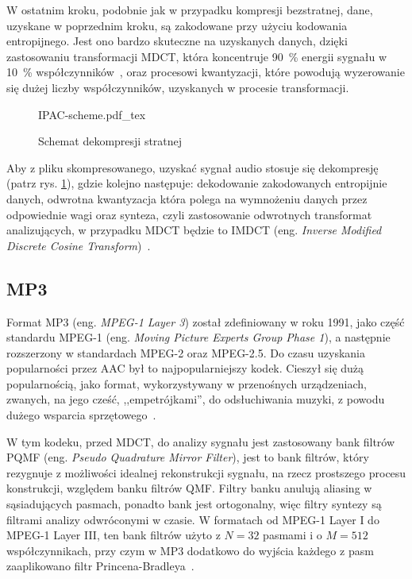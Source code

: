 \documentclass[pl,12pt]{aghdpl}
\let\Oldsubsection\subsection%
\renewcommand{\subsection}{\FloatBarrier\Oldsubsection}
\begin{document}
W ostatnim kroku, podobnie jak w przypadku kompresji bezstratnej, dane,
uzyskane w poprzednim kroku, są zakodowane przy użyciu kodowania entropijnego.
Jest ono bardzo skuteczne na uzyskanych danych, dzięki zastosowaniu
transformacji MDCT, która koncentruje \SI{90}{\percent} energii sygnału w
\SI{10}{\percent} współczynników~\cite{WangYaroslavskyVilermoVaananen2000}, oraz
procesowi kwantyzacji, które powodują wyzerowanie się dużej liczby
współczynników, uzyskanych w procesie transformacji.

\begin{figure}[!tbh]
  \centering
  {IPAC-scheme.pdf_tex}
  \caption{Schemat dekompresji stratnej}
  \label{fig:IPAC_scheme}
\end{figure}

Aby z pliku skompresowanego, uzyskać sygnał audio stosuje się dekompresję
(patrz rys. \ref{fig:IPAC_scheme}), gdzie kolejno następuje: dekodowanie
zakodowanych entropijnie danych, odwrotna kwantyzacja która polega na
wymnożeniu danych przez odpowiednie wagi oraz synteza, czyli zastosowanie
odwrotnych transformat analizujących, w przypadku MDCT będzie to IMDCT (eng.
\textit{Inverse Modified Discrete Cosine Transform})~\cite{Brandenburg1999}.

\subsection{MP3}
Format MP3 (eng. \textit{MPEG-1 Layer 3}) został zdefiniowany w roku 1991, jako
część standardu MPEG-1 (eng. \textit{Moving Picture Experts Group Phase 1}), a
następnie rozszerzony w standardach MPEG-2 oraz
MPEG-2.5. Do czasu uzyskania popularności przez AAC był
to najpopularniejszy kodek. Cieszył się dużą popularnością, jako format,
wykorzystywany w przenośnych urządzeniach, zwanych, na jego cześć,
,,empetrójkami'', do odsłuchiwania muzyki, z powodu dużego wsparcia
sprzętowego~\cite{Brandenburg1999}.

W tym kodeku, przed MDCT, do analizy sygnału jest zastosowany bank
filtrów PQMF (eng. \textit{Pseudo Quadrature Mirror Filter}), jest to bank
filtrów, który rezygnuje z możliwości idealnej rekonstrukcji sygnału, na rzecz
prostszego procesu konstrukcji, względem banku filtrów QMF. Filtry banku
anulują aliasing w sąsiadujących pasmach, ponadto bank jest ortogonalny, więc
filtry syntezy są filtrami analizy odwróconymi w czasie.  W formatach od MPEG-1
Layer I do MPEG-1 Layer III, ten bank filtrów użyto z $N = 32$ pasmami i o $M =
512$ współczynnikach, przy czym w MP3 dodatkowo do wyjścia każdego z pasm
zaaplikowano filtr Princena-Bradleya~\cite{Smith2011}.
\end{document}
